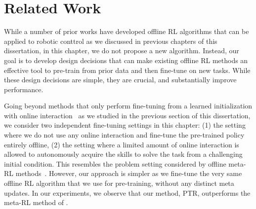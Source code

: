 \section{Related Work}
\label{sec:related}


While a number of prior works have developed offline RL algorithms that can be applied to robotic conttrol as we discussed in previous chapters of this dissertation, in this chapter, we do not propose a new algorithm. Instead, our goal is to develop design decisions that can make existing offline RL methods an effective tool to pre-train from prior data and then fine-tune on new tasks. While these design decisions are simple, they are crucial, and substantially improve performance.

Going beyond methods that only perform fine-tuning from a learned initialization with online interaction~\citep{nair2020accelerating,kostrikov2021iql,lee2022offline} as we studied in the previous section of this dissertation, we consider two independent fine-tuning settings in this chapter: (1) the setting where we do not use any online interaction and fine-tune the pre-trained policy entirely offline, (2) the setting where a limited amount of online interaction is allowed to autonomously acquire the skills to solve the task from a challenging initial condition. This resembles the problem setting considered by offline meta-RL methods~\citep{li2019multi, dorfman2020offline, mitchell2021offline, pong2021offline,lin2022model}. However, our approach is simpler as we fine-tune the very same offline RL algorithm that we use for pre-training, without any distinct meta updates. In our experiments, we observe that our method, PTR, outperforms the meta-RL method of \citet{mitchell2021offline}. 

